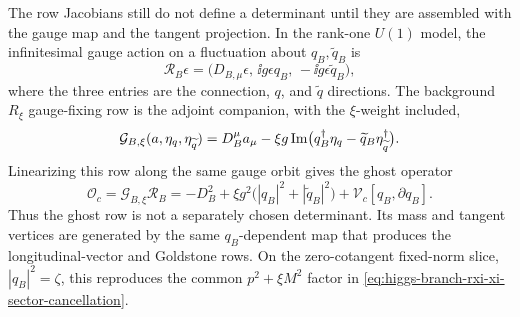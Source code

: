 \begin{example}
\label{ex:higgs-branch-gauge-fixed-heavy-package}
The row Jacobians still do not define a determinant until they are assembled
with the gauge map and the tangent projection.  In the rank-one \(U(1)\) model,
the infinitesimal gauge action on a fluctuation about \(q_B,\widetilde q_B\) is
\begin{equation}
  {\mathcal R}_B\epsilon
  =
  \bigl(D_{B,\mu}\epsilon,\,
        \ii g\epsilon q_B,\,
        -\ii g\epsilon\widetilde q_B\bigr),
  \label{eq:higgs-branch-gauge-map}
\end{equation}
where the three entries are the connection, \(q\), and \(\widetilde q\)
directions.  The background \(R_\xi\) gauge-fixing row is the adjoint companion,
with the \(\xi\)-weight included,
\begin{equation}
  {\mathcal G}_{B,\xi}(a,\eta_q,\eta_{\widetilde q})
  =
  D_B^\mu a_\mu
  -
  \xi g\,{\rm Im}
  \bigl(q_B^\dagger\eta_q
        -
        \widetilde q_B\eta_{\widetilde q}^\dagger\bigr).
  \label{eq:higgs-branch-gauge-fixing-adjoint-row}
\end{equation}
Linearizing this row along the same gauge orbit gives the ghost operator
\begin{equation}
  {\mathcal O}_c
  =
  {\mathcal G}_{B,\xi}{\mathcal R}_B
  =
  -D_B^2
  +
  \xi g^2\bigl(|q_B|^2+|\widetilde q_B|^2\bigr)
  +
  {\mathcal V}_c[q_B,\partial q_B].
  \label{eq:higgs-branch-ghost-from-gauge-map}
\end{equation}
Thus the ghost row is not a separately chosen determinant.  Its mass and
tangent vertices are generated by the same \(q_B\)-dependent map that produces
the longitudinal-vector and Goldstone rows.  On the zero-cotangent fixed-norm
slice, \(|q_B|^2=\zeta\), this reproduces the common \(p^2+\xi M^2\) factor in
\eqref{eq:higgs-branch-rxi-xi-sector-cancellation}.


\end{example}
